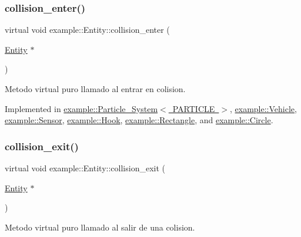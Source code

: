 \subsubsection{\texorpdfstring{collision\_enter()}{collision\_enter()}}
{\footnotesize\ttfamily virtual void example\+::\+Entity\+::collision\+\_\+enter (\begin{DoxyParamCaption}\item[{\mbox{\hyperlink{classexample_1_1_entity}{Entity}} $\ast$}]{ }\end{DoxyParamCaption})\hspace{0.3cm}{\ttfamily [pure virtual]}}



Metodo virtual puro llamado al entrar en colision. 



Implemented in \mbox{\hyperlink{classexample_1_1_particle___system_a7abd68650036023393e7bb7cc5d28d49}{example\+::\+Particle\+\_\+\+System$<$ P\+A\+R\+T\+I\+C\+L\+E $>$}}, \mbox{\hyperlink{classexample_1_1_vehicle_af1a5fe70938e564d67b69487938f6f63}{example\+::\+Vehicle}}, \mbox{\hyperlink{classexample_1_1_sensor_a3134d06af95de83a7392c3687411eb17}{example\+::\+Sensor}}, \mbox{\hyperlink{classexample_1_1_hook_a44bba68a70104e45a890311d5edd91a0}{example\+::\+Hook}}, \mbox{\hyperlink{classexample_1_1_rectangle_a60fa2e1468370d1c7021f25df8a4c1d7}{example\+::\+Rectangle}}, and \mbox{\hyperlink{classexample_1_1_circle_a098e101e7fe49694bf9f26749d48e62e}{example\+::\+Circle}}.

\mbox{\label{classexample_1_1_entity_ae5d520b5f0dda6bb56a6c74eaf1c850c}} 
\subsubsection{\texorpdfstring{collision\_exit()}{collision\_exit()}}
{\footnotesize\ttfamily virtual void example\+::\+Entity\+::collision\+\_\+exit (\begin{DoxyParamCaption}\item[{\mbox{\hyperlink{classexample_1_1_entity}{Entity}} $\ast$}]{ }\end{DoxyParamCaption})\hspace{0.3cm}{\ttfamily [pure virtual]}}



Metodo virtual puro llamado al salir de una colision. 



